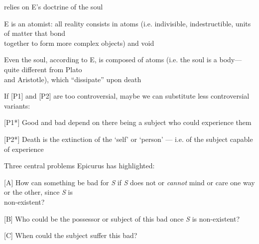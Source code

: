 \documentclass[11pt]{article}
\begin{document}
\noindent [P2] relies on E's doctrine of the soul
\vspace*{1mm}

E is an atomist: all reality consists in atoms (i.e. indivisible, indestructible, units of matter that bond\\\hspace*{6mm}together to form more complex objects) and void
\vspace*{1mm}

Even the soul, according to E, is composed of atoms (i.e. the soul is a body---quite different from Plato\\\hspace*{6mm}and Aristotle), which ``dissipate'' upon death
\vspace*{2mm}

\noindent If [P1] and [P2] are too controversial, maybe we can substitute less controversial variants:
\vspace*{2mm}

[P1*] Good and bad depend on there being a subject who could experience them
\vspace*{1mm}

[P2*] Death is the extinction of the `self' or `person' --- i.e. of the subject capable of experience
\vspace*{2mm}

\noindent Three central problems Epicurus has highlighted:
\vspace*{2mm}

[A] How can something be bad for \emph{S} if \emph{S} does not or \emph{cannot} mind or care one way or the other, since \emph{S} is\\\hspace*{13mm}non-existent?
\vspace*{1mm}

[B] Who could be the possessor or subject of this bad once \emph{S} is non-existent?
\vspace*{1mm}

[C] When could the subject suffer this bad?
\end{document}
